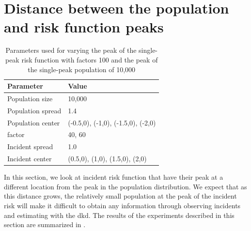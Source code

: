 


\section{Distance between the population and risk function peaks}
\label{sec:results:p1.4_Gap_risk}

\begin{table}[htbp]
    \centering
    \begin{tabular}{ll}
        \toprule
        Parameter & Value \\
        \midrule
        Population size & 10,000 \\
        Population \gls{spread} & 1.4 \\
        Population center & (-0.5,0), (-1,0), (-1.5,0), (-2,0) \\
        \Gls{factor} & 40, 60 \\
        Incident \gls{spread} & 1.0 \\
        Incident center & (0.5,0), (1,0), (1.5,0), (2,0) \\
        \bottomrule
    \end{tabular}
    \caption{Parameters used for varying the peak of the single-peak risk function with \glspl{factor} 100 and the peak of the single-peak population of 10,000}
    \label{tab:params:p1.4_100_Gap_risk}
\end{table}

In this section, we look at incident risk function that have their peak at a different location from the peak in the population distribution.
We expect that as this distance grows, the relatively small population at the peak of the incident risk will make it difficult to obtain any information through observing incidents and estimating with the \gls{dkd}.
The results of the experiments described in this section are summarized in .

